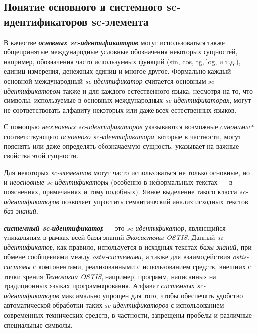\subsection{Понятие основного и системного sc-идентификаторов sc-элемента}
\label{sec_main_and_system_identifiers_concept}

В качестве \textbf{\textit{основных sc-идентификаторов}} могут использоваться также общепринятые международные условные обозначения некоторых сущностей, например, обозначения часто используемых функций (sin, cos, tg, log, и т.д.), единиц измерения, денежных единиц и многое другое. Формально каждый основной международный \textit{sc-идентификатор} считается основным \textit{sc-идентификатором} также и для каждого естественного языка, несмотря на то, что символы, используемые в основных международных \textit{sc-идентификаторах}, могут не соответствовать алфавиту некоторых или даже всех естественных языков.

С помощью \textit{неосновных sc-идентификаторов} указываются возможные \textit{синонимы*} соответствующего \textit{основного sc-идентификатора}, которые в частности, могут пояснять или даже определять обозначаемую сущность, указывает на важные свойства этой сущности.

Для некоторых \textit{sc-элементов} могут часто использоваться не только основные, но и \textit{неосновные sc-идентификаторы} (особенно в неформальных текстах --- в пояснениях, примечаниях и тому подобных). Явное выделение такого класса \textit{sc-идентификаторов} позволяет упростить семантический анализ исходных текстов \textit{баз знаний}.

\textbf{\textit{системный sc-идентификатор}} --- это \textit{sc-идентификатор}, являющийся уникальным в рамках всей базы знаний \textit{Экосистемы OSTIS}. Данный \textit{sc-идентификатор}, как правило, используется в исходных текстах \textit{базы знаний}, при обмене сообщениями между \textit{ostis-системами}, а также для взаимодействия \textit{ostis-системы} с компонентами, реализованными с использованием средств, внешних с точки зрения \textit{Технологии OSTIS}, например, программ, написанных на традиционных языках программирования. Алфавит \textit{системных sc-идентификаторов} максимально упрощен для того, чтобы обеспечить удобство автоматической обработки таких \textit{sc-идентификаторов} с использованием современных технических средств, в частности, запрещены пробелы и различные специальные символы.

